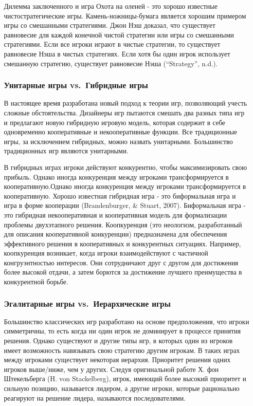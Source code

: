 Дилемма заключенного и игра Охота на оленей - это хорошо известные
чистостратегические игры. Камень-ножницы-бумага является хорошим
примером игры со смешанными стратегиями. Джон Нэш доказал, что
существует равновесие для каждой конечной чистой стратегии или игры со
смешанными стратегиями. Если все игроки играют в чистые стратегии, то
существует равновесие Нэша в чистых стратегиях. Если хотя бы один игрок
использует смешанную стратегию, существует равновесие Нэша
(``Strategy'', n.d.).

\subsubsection{Унитарные игры vs.~Гибридные
игры}

В настоящее время разработана новый подход к теории игр, позволяющий
учесть сложные обстоятельства. Дизайнеры игр пытаются смешать два разных
типа игр и предлагают новую гибридную игровую модель, которая содержит в
себе одновременно кооперативные и некооперативные функции. Все
традиционные игры, за исключением гибридных, можно назвать унитарными.
Большинство традиционных игр являются унитарными.

В гибридных играх игроки действуют конкурентно, чтобы максимизировать
свою прибыль. Однако иногда конкуренция между игроками трансформируется
в кооперативную.Однако иногда конкуренция между игроками
трансформируется в кооперативную. Хорошо известная гибридная игра - это
биформальная игра и игра в форме кооперации (Brandenburger, \& Stuart,
2007). Биформальная игра - это гибридная некооперативная и кооперативная
модель для формализации проблемы двухэтапного решения. Коопкуренция (это
неологизм, разработанный для описания кооперативной конкуренции)
предназначена для обеспечения эффективного решения в кооперативных и
конкурентных ситуациях. Например, коопкуренция возникает, когда игроки
взаимодействуют с частичной конгруэнтностью интересов. Они сотрудничают
друг с другом для достижения более высокой отдачи, а затем борются за
достижение лучшего преимущества в конкурентной борьбе.

\subsubsection{Эгалитарные игры vs.~Иерархические
игры}

Большинство классических игр разработано на основе предположения, что
игроки симметричны, то есть когда ни один игрок не доминирует в процессе
принятия решения. Однако существуют и другие типы игр, в которых один из
игроков имеет возможность навязывать свою стратегию другим игрокам. В
таких играх между игроками существует некоторая иерархия. Приоритет
решения одних игроков выше/ниже, чем у других. Следуя оригинальной
работе Х. фон Штекельберга (H. von Stackelberg), игрок, имеющий более
высокий приоритет и сильную позицию, называется лидером, а другие
игроки, которые рационально реагируют на решение лидера, называются
последователями.

